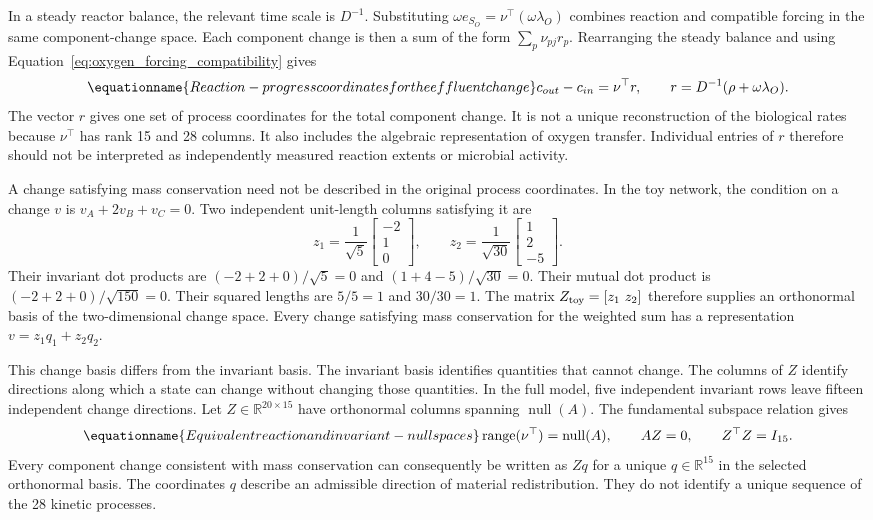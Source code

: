In a steady reactor balance, the relevant time scale is $D^{-1}$. Substituting $\omega e_{S_O}=\nu^\top(\omega\lambda_O)$ combines reaction and compatible forcing in the same component-change space. Each component change is then a sum of the form $\sum_p\nu_{pj}r_p$. Rearranging the steady balance and using Equation~\eqref{eq:oxygen_forcing_compatibility} gives
\begin{equation}
\equationname{Reaction-progress coordinates for the effluent change}
c_{out}-c_{in}=\nu^\top r,\qquad
r=D^{-1}(\rho+\omega\lambda_O).
\label{eq:reaction_progress_coordinates}
\end{equation}
The vector $r$ gives one set of process coordinates for the total component change. It is not a unique reconstruction of the biological rates because $\nu^\top$ has rank 15 and 28 columns. It also includes the algebraic representation of oxygen transfer. Individual entries of $r$ therefore should not be interpreted as independently measured reaction extents or microbial activity.

A change satisfying mass conservation need not be described in the original process coordinates. In the toy network, the condition on a change $v$ is $v_A+2v_B+v_C=0$. Two independent unit-length columns satisfying it are
\[
z_1=\frac1{\sqrt5}\begin{bmatrix}-2\\1\\0\end{bmatrix},\qquad
z_2=\frac1{\sqrt{30}}\begin{bmatrix}1\\2\\-5\end{bmatrix}.
\]
Their invariant dot products are $(-2+2+0)/\sqrt5=0$ and $(1+4-5)/\sqrt{30}=0$. Their mutual dot product is $(-2+2+0)/\sqrt{150}=0$. Their squared lengths are $5/5=1$ and $30/30=1$. The matrix $Z_{\rm toy}=[z_1\ z_2]$ therefore supplies an orthonormal basis of the two-dimensional change space. Every change satisfying mass conservation for the weighted sum has a representation $v=z_1q_1+z_2q_2$.

This change basis differs from the invariant basis. The invariant basis identifies quantities that cannot change. The columns of $Z$ identify directions along which a state can change without changing those quantities. In the full model, five independent invariant rows leave fifteen independent change directions. Let $Z\in\mathbb{R}^{20\times15}$ have orthonormal columns spanning $\operatorname{null}(A)$. The fundamental subspace relation gives
\begin{equation}
\equationname{Equivalent reaction and invariant-null spaces}
\operatorname{range}(\nu^\top)=\operatorname{null}(A),\qquad
AZ=0,\qquad Z^\top Z=I_{15}.
\label{eq:reaction_invariant_subspaces}
\end{equation}
Every component change consistent with mass conservation can consequently be written as $Zq$ for a unique $q\in\mathbb{R}^{15}$ in the selected orthonormal basis. The coordinates $q$ describe an admissible direction of material redistribution. They do not identify a unique sequence of the 28 kinetic processes.

